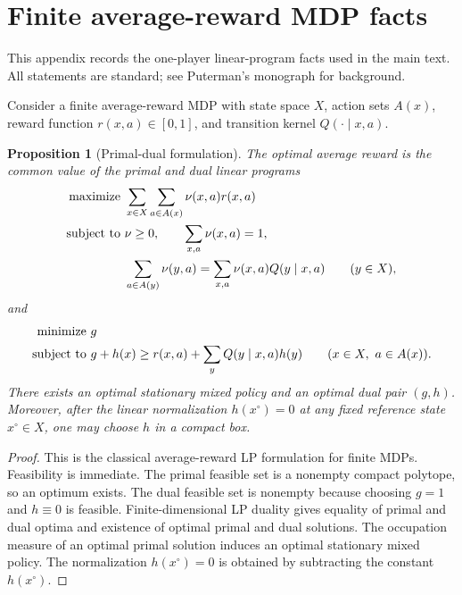 \documentclass[12pt]{article}
\newtheorem{proposition}[theorem]{Proposition}
\theoremstyle{definition}
\newcommand{\1}{\mathbf{1}}
\begin{document}
\appendix

\section{Finite average-reward MDP facts}
\label{app:mdp}

This appendix records the one-player linear-program facts used in the main text.
All statements are standard; see Puterman's monograph \cite{Puterman1994} for
background.

Consider a finite average-reward MDP with state space $X$, action sets $A(x)$,
reward function $r(x,a)\in[0,1]$, and transition kernel $Q(\cdot\mid x,a)$.

\begin{proposition}[Primal-dual formulation]
\label{prop:mdp-duality}
The optimal average reward is the common value of the primal and dual linear
programs
\begin{align*}
\textnormal{maximize }&\sum_{x\in X}\sum_{a\in A(x)}\nu(x,a)r(x,a)
\\
\textnormal{subject to }&\nu\ge 0,
\qquad \sum_{x,a}\nu(x,a)=1,
\\
&\sum_{a\in A(y)}\nu(y,a)=\sum_{x,a}\nu(x,a)Q(y\mid x,a)
\qquad (y\in X),
\end{align*}
and
\begin{align*}
\textnormal{minimize }&g
\\
\textnormal{subject to }&g+h(x)\ge r(x,a)+\sum_y Q(y\mid x,a)h(y)
\qquad (x\in X,\ a\in A(x)).
\end{align*}
There exists an optimal stationary mixed policy and an optimal dual pair $(g,h)$.
Moreover, after the linear normalization $h(x^\circ)=0$ at any fixed reference
state $x^\circ\in X$, one may choose $h$ in a compact box.
\end{proposition}

\begin{proof}
This is the classical average-reward LP formulation for finite MDPs. Feasibility is
immediate. The primal feasible set is a nonempty compact polytope, so an optimum
exists. The dual feasible set is nonempty because choosing $g=1$ and $h\equiv 0$
is feasible. Finite-dimensional LP duality gives equality of primal and dual
optima and existence of optimal primal and dual solutions. The occupation measure
of an optimal primal solution induces an optimal stationary mixed policy. The
normalization $h(x^\circ)=0$ is obtained by subtracting the constant $h(x^\circ)$.
\end{proof}
\end{document}
